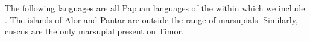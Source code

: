 The following languages are all Papuan languages of the 
within which we include .
The islands of Alor
and Pantar are outside the range of marsupials.
Similarly, cuscus are the only marsupial present on Timor.

%
